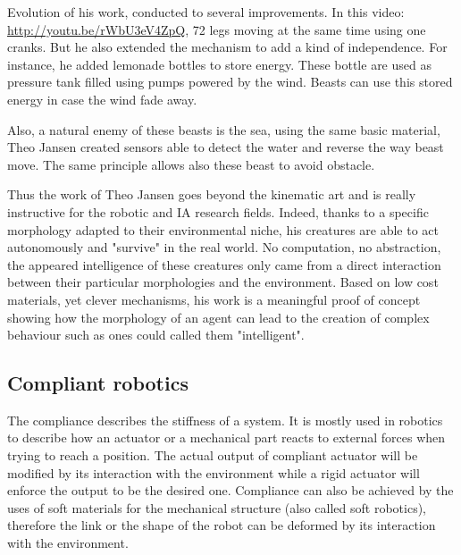 Evolution of his work, conducted to several improvements. In this video: \url{http://youtu.be/rWbU3eV4ZpQ}, 72 legs moving at the same time using one cranks. But he also extended the mechanism to add a kind of independence. For instance, he added lemonade bottles to store energy. These bottle are used as pressure tank filled using pumps powered by the wind. Beasts can use this stored energy in case the wind fade away.

Also, a natural enemy of these beasts is the sea, using the same basic material, Theo Jansen created sensors able to detect the water and reverse the way beast move. The same principle allows also these beast to avoid obstacle.

Thus the work of Theo Jansen goes beyond the kinematic art and is really instructive for the robotic and IA research fields. Indeed, thanks to a specific morphology adapted to their environmental niche, his creatures are able to act autonomously and "survive" in the real world. No computation, no abstraction, the appeared intelligence of these creatures only came from a direct interaction between their particular morphologies and the environment. Based on low cost materials, yet clever mechanisms, his work is a meaningful proof of concept showing how the morphology of an agent can lead to the creation of complex behaviour such as ones could called them "intelligent".





\subsection{Compliant robotics} %
The compliance describes the stiffness of a system. It is mostly used in robotics to describe how an actuator or a mechanical part reacts to external forces when trying to reach a position. The actual output of compliant actuator will be modified by its interaction with the environment while a rigid actuator will enforce the output to be the desired one. Compliance can also be achieved by the uses of soft materials for the mechanical structure (also called soft robotics), therefore the link or the shape of the robot can be deformed by its interaction with the environment.

